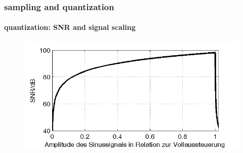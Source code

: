 	\begin{frame}\frametitle{sampling and quantization}\framesubtitle{quantization: SNR and signal scaling}
	    \begin{figure}
			\centering
				\includegraphics[scale=0.7]{Graph/snr}
		\end{figure}
	\end{frame}	
	
